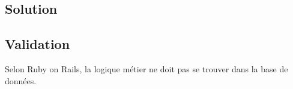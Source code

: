 \begin{english}

\begin{Shaded}
\begin{Highlighting}[]

 \NormalTok{ \textless{} }\NormalTok{::}
 
\NormalTok{)}
\end{Highlighting}
\end{Shaded}

\end{english}

\hypertarget{solution}{%
\subsection{Solution}\label{solution}}

\begin{english}

\begin{Shaded}
\begin{Highlighting}[]

\KeywordTok{:}
\AttributeTok{  }\KeywordTok{:}
\AttributeTok{  }\KeywordTok{:}
\AttributeTok{  }\KeywordTok{:}\AttributeTok{ }
\end{Highlighting}
\end{Shaded}

\end{english}

\hypertarget{validation}{%
\subsection{Validation}\label{validation}}

Selon Ruby on Rails, la logique métier ne doit pas se trouver dans la
base de données.

